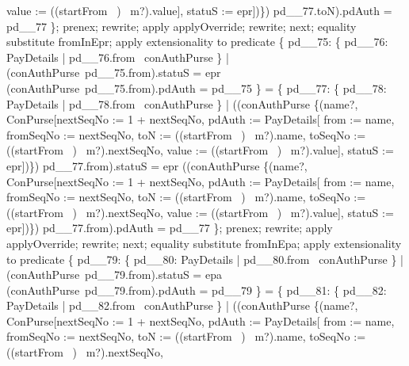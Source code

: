 \begin{LPScript}
\begin{zproof}[lPromotedAuxWorldStartFromType]
                        value := ((startFrom~ \inv)~ m?).value],
                    statuS := epr])\}) pd\_\_77.toN).pdAuth = pd\_\_77 \};
        prenex;
        rewrite;
        apply applyOverride;
        rewrite;
    next;
        equality substitute fromInEpr;
        apply extensionality to predicate
            \{ pd\_\_75: \{ pd\_\_76: PayDetails | pd\_\_76.from \in \dom~conAuthPurse \}
                | (conAuthPurse~pd\_\_75.from).statuS = epr
                \land (conAuthPurse~pd\_\_75.from).pdAuth = pd\_\_75 \}
            = \{ pd\_\_77: \{ pd\_\_78: PayDetails | pd\_\_78.from \in \dom~conAuthPurse \}
                | ((conAuthPurse \oplus \{(name?, \theta ConPurse[nextSeqNo := 1 + nextSeqNo,
                pdAuth := \theta PayDetails[
                        from := name, fromSeqNo := nextSeqNo,
                        toN := ((startFrom~ \inv)~ m?).name,
                        toSeqNo := ((startFrom~ \inv)~ m?).nextSeqNo,
                        value := ((startFrom~ \inv)~ m?).value],
                    statuS := epr])\}) pd\_\_77.from).statuS = epr
             \land ((conAuthPurse \oplus \{(name?, \theta ConPurse[nextSeqNo := 1 + nextSeqNo,
                pdAuth := \theta PayDetails[
                        from := name, fromSeqNo := nextSeqNo,
                        toN := ((startFrom~ \inv)~ m?).name,
                        toSeqNo := ((startFrom~ \inv)~ m?).nextSeqNo,
                        value := ((startFrom~ \inv)~ m?).value],
                    statuS := epr])\}) pd\_\_77.from).pdAuth = pd\_\_77 \};
        prenex;
        rewrite;
        apply applyOverride;
        rewrite;
    next;
        equality substitute fromInEpa;
        apply extensionality to predicate
            \{ pd\_\_79: \{ pd\_\_80: PayDetails | pd\_\_80.from \in \dom~conAuthPurse \}
                | (conAuthPurse~pd\_\_79.from).statuS = epa
                \land (conAuthPurse~pd\_\_79.from).pdAuth = pd\_\_79 \}
            = \{ pd\_\_81: \{ pd\_\_82: PayDetails | pd\_\_82.from \in \dom~conAuthPurse \}
                | ((conAuthPurse \oplus \{(name?, \theta ConPurse[nextSeqNo := 1 + nextSeqNo,
                 pdAuth := \theta PayDetails[
                        from := name, fromSeqNo := nextSeqNo,
                        toN := ((startFrom~ \inv)~ m?).name,
                        toSeqNo := ((startFrom~ \inv)~ m?).nextSeqNo,

\end{zproof}
\end{LPScript}

